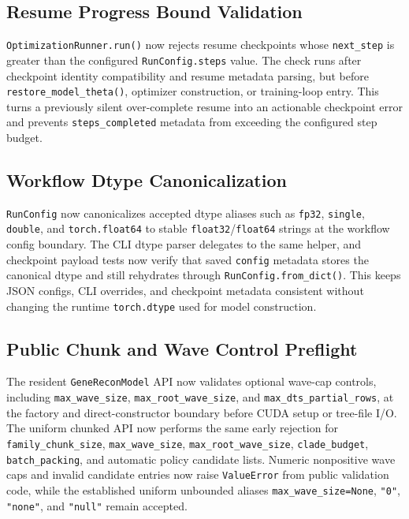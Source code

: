 \documentclass[11pt]{article}
\begin{document}
\subsection{Resume Progress Bound Validation}

\texttt{OptimizationRunner.run()} now rejects resume checkpoints whose
\texttt{next\_step} is greater than the configured \texttt{RunConfig.steps}
value.  The check runs after checkpoint identity compatibility and resume
metadata parsing, but before \texttt{restore\_model\_theta()}, optimizer
construction, or training-loop entry.  This turns a previously silent
over-complete resume into an actionable checkpoint error and prevents
\texttt{steps\_completed} metadata from exceeding the configured step budget.

\subsection{Workflow Dtype Canonicalization}

\texttt{RunConfig} now canonicalizes accepted dtype aliases such as
\texttt{fp32}, \texttt{single}, \texttt{double}, and
\texttt{torch.float64} to stable \texttt{float32}/\texttt{float64} strings at
the workflow config boundary.  The CLI dtype parser delegates to the same
helper, and checkpoint payload tests now verify that saved \texttt{config}
metadata stores the canonical dtype and still rehydrates through
\texttt{RunConfig.from\_dict()}.  This keeps JSON configs, CLI overrides, and
checkpoint metadata consistent without changing the runtime
\texttt{torch.dtype} used for model construction.

\subsection{Public Chunk and Wave Control Preflight}

The resident \texttt{GeneReconModel} API now validates optional wave-cap
controls, including \texttt{max\_wave\_size},
\texttt{max\_root\_wave\_size}, and \texttt{max\_dts\_partial\_rows}, at the
factory and direct-constructor boundary before CUDA setup or tree-file I/O.
The uniform chunked API now performs the same early rejection for
\texttt{family\_chunk\_size}, \texttt{max\_wave\_size},
\texttt{max\_root\_wave\_size}, \texttt{clade\_budget},
\texttt{batch\_packing}, and automatic policy candidate lists.  Numeric
nonpositive wave caps and invalid candidate entries now raise
\texttt{ValueError} from public validation code, while the established
uniform unbounded aliases \texttt{max\_wave\_size=None}, \texttt{"0"},
\texttt{"none"}, and \texttt{"null"} remain accepted.
\end{document}
